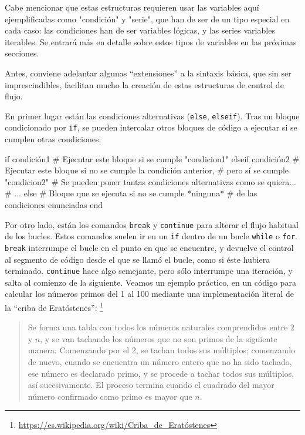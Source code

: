 ﻿\documentclass{article}
\newcommand{\code}{\texttt}
\begin{document}
Cabe mencionar que estas estructuras requieren usar las variables aquí ejemplificadas como "condición" y "serie", que han de ser de un tipo especial en cada caso: las condiciones han de ser variables lógicas, y las series variables iterables. Se entrará más en detalle sobre estos tipos de variables en las próximas secciones.

Antes, conviene adelantar algunas ``extensiones'' a la sintaxis básica, que sin ser imprescindibles, facilitan mucho la creación de estas estructuras de control de flujo.

En primer lugar están las condiciones alternativas (\code{else}, \code{elseif}). Tras un bloque condicionado por \code{if}, se pueden intercalar otros bloques de código a ejecutar si se cumplen otras condiciones:

if condición1
  # Ejecutar este bloque si se cumple "condicion1"
elseif condición2
  # Ejecutar este bloque si no se cumple la condición anterior,
  # pero sí se cumple "condicion2"
  # Se pueden poner tantas condiciones alternativas como se quiera...
  # ...
else
  # Bloque que se ejecuta si no se cumple *ninguna*
  # de las condiciones enunciadas
end

Por otro lado, están los comandos \code{break} y \code{continue} para alterar el flujo habitual de los bucles. Estos comandos suelen ir en un \code{if} dentro de un bucle \code{while} o \code{for}. \code{break} interrumpe el bucle en el punto en que se encuentre, y devuelve el control al segmento de código desde el que se llamó el bucle, como si éste hubiera terminado. \code{continue} hace algo semejante, pero sólo interrumpe una iteración, y salta al comienzo de la siguiente. Veamos un ejemplo práctico, en un código para calcular los números primos del 1 al 100 mediante una implementación literal de la ``criba de Eratóstenes'':%
\footnote{%
\url{https://es.wikipedia.org/wiki/Criba_de_Eratóstenes}%
}

\begin{quote}
Se forma una tabla con todos los números naturales comprendidos entre $2$ y $n$, y se van tachando los números que no son primos de la siguiente manera: Comenzando por el 2, se tachan todos sus múltiplos; comenzando de nuevo, cuando se encuentra un número entero que no ha sido tachado, ese número es declarado primo, y se procede a tachar todos sus múltiplos, así sucesivamente. El proceso termina cuando el cuadrado del mayor número confirmado como primo es mayor que $n$.
\end{quote}
\end{document}
